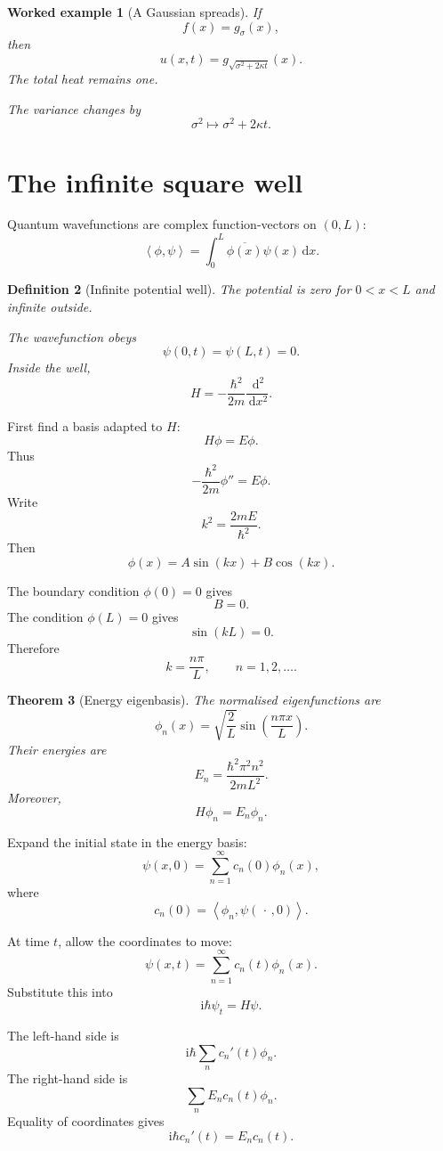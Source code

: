 \documentclass[11pt,a5paper,oneside,openany]{scrreprt}
\theoremstyle{notes}
\newtheorem{theorem}{Theorem}[section]
\theoremstyle{definitions}
\newtheorem{definition}[theorem]{Definition}
\newtheorem{example}[theorem]{Worked example}
\newcommand{\ip}[2]{\left\langle #1,#2\right\rangle}
\newcommand{\dd}{\,\mathrm{d}}
\begin{document}
\begin{example}[A Gaussian spreads]
If
\[
 f(x)=g_\sigma(x),
\]
then
\[
 \boxed{
 u(x,t)
 =g_{\sqrt{\sigma^2+2\kappa t}}(x).}
\]
The total heat remains one.

The variance changes by
\[
 \sigma^2\longmapsto\sigma^2+2\kappa t.
\]
\end{example}

\section{The infinite square well}

Quantum wavefunctions are complex function-vectors on $(0,L)$:
\[
 \ip{\phi}{\psi}
 =\int_0^L\overline{\phi(x)}\psi(x)\dd x.
\]

\begin{definition}[Infinite potential well]
The potential is zero for $0<x<L$ and infinite outside.

The wavefunction obeys
\[
 \psi(0,t)=\psi(L,t)=0.
\]
Inside the well,
\[
 \boxed{
 H=-\frac{\hbar^2}{2m}\frac{\dd^2}{\dd x^2}.}
\]
\end{definition}

First find a basis adapted to $H$:
\[
 H\phi=E\phi.
\]
Thus
\[
 -\frac{\hbar^2}{2m}\phi''=E\phi.
\]
Write
\[
 k^2=\frac{2mE}{\hbar^2}.
\]
Then
\[
 \phi(x)=A\sin(kx)+B\cos(kx).
\]

The boundary condition $\phi(0)=0$ gives
\[
 B=0.
\]
The condition $\phi(L)=0$ gives
\[
 \sin(kL)=0.
\]
Therefore
\[
 k=\frac{n\pi}{L},
 \qquad n=1,2,\ldots .
\]

\begin{theorem}[Energy eigenbasis]
The normalised eigenfunctions are
\[
 \boxed{
 \phi_n(x)
 =\sqrt{\frac2L}
 \sin\!\left(\frac{n\pi x}{L}\right).}
\]
Their energies are
\[
 \boxed{
 E_n=\frac{\hbar^2\pi^2n^2}{2mL^2}.}
\]
Moreover,
\[
 H\phi_n=E_n\phi_n.
\]
\end{theorem}

Expand the initial state in the energy basis:
\[
 \psi(x,0)
 =\sum_{n=1}^{\infty}c_n(0)\phi_n(x),
\]
where
\[
 c_n(0)=\ip{\phi_n}{\psi(\,\cdot\,,0)}.
\]

At time $t$, allow the coordinates to move:
\[
 \psi(x,t)
 =\sum_{n=1}^{\infty}c_n(t)\phi_n(x).
\]
Substitute this into
\[
 \mathrm i\hbar\psi_t=H\psi.
\]

The left-hand side is
\[
 \mathrm i\hbar
 \sum_n c_n'(t)\phi_n.
\]
The right-hand side is
\[
 \sum_n E_nc_n(t)\phi_n.
\]
Equality of coordinates gives
\[
 \mathrm i\hbar c_n'(t)=E_nc_n(t).
\]
\end{document}
